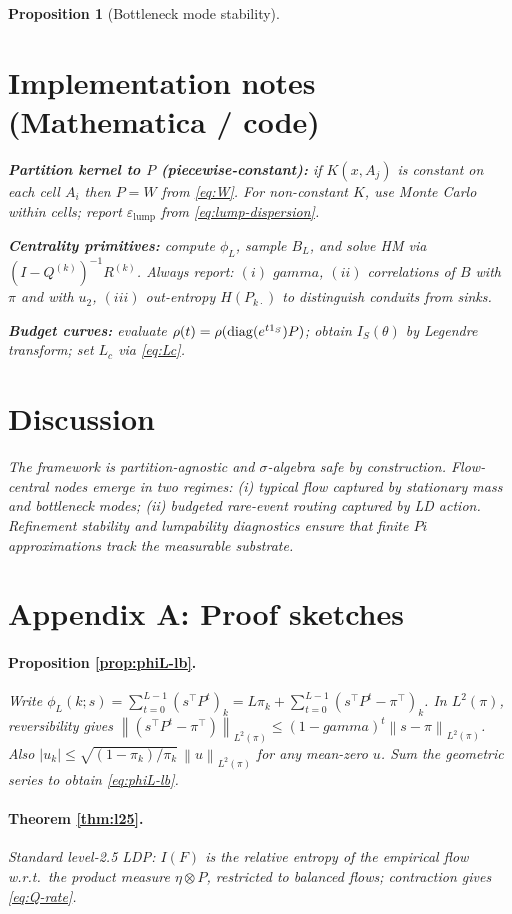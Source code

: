 \documentclass[11pt]{article}
\def\Pi{Pi}%
\def\sgap{gamma}%
\newcommand{\1}{\mathbbm{1}}
\newcommand{\diag}{\mathrm{diag}}
\newcommand{\norm}[1]{\left\lVert #1 \right\rVert}
\newcommand{\abs}[1]{\left\lvert #1 \right\rvert}
\newcommand{\sgap}{\gamma}
\theoremstyle{plain}
\newtheorem{proposition}[theorem]{Proposition}
\theoremstyle{definition}
\begin{document}
\begin{proposition}[Bottleneck mode stability]
\section{Implementation notes (Mathematica / code)}
\label{sec:impl}
\textbf{Partition kernel to $P$ (piecewise-constant):} if $K(x,A_j)$ is constant on each cell $A_i$ then $P=W$ from \eqref{eq:W}. For non-constant $K$, use Monte Carlo within cells; report $\varepsilon_{\mathrm{lump}}$ from \eqref{eq:lump-dispersion}.

\textbf{Centrality primitives:} compute $\phi_L$, sample $B_L$, and solve HM via $(I-Q^{(k)})^{-1}R^{(k)}$. Always report: $(i)$ $\sgap$, $(ii)$ correlations of $B$ with $\pi$ and with $u_2$, $(iii)$ out-entropy $H(P_{k\cdot})$ to distinguish conduits from sinks.

\textbf{Budget curves:} evaluate $\rho(t)=\rho(\diag(e^{t\1_S})P)$; obtain $I_S(\theta)$ by Legendre transform; set $L_c$ via \eqref{eq:Lc}.

\section{Discussion}
The framework is partition-agnostic and $\sigma$-algebra safe by construction. Flow-central nodes emerge in two regimes: (i) typical flow captured by stationary mass and bottleneck modes; (ii) budgeted rare-event routing captured by LD action. Refinement stability and lumpability diagnostics ensure that finite $\Pi$ approximations track the measurable substrate.

\section*{Appendix A: Proof sketches}
\paragraph{Proposition \ref{prop:phiL-lb}.}
Write $\phi_L(k;s)=\sum_{t=0}^{L-1}(s^\top P^t)_k=L\pi_k+\sum_{t=0}^{L-1}(s^\top P^t-\pi^\top)_k$. In $L^2(\pi)$, reversibility gives $\norm{(s^\top P^t-\pi^\top)}_{L^2(\pi)}\le (1-\sgap)^t\norm{s-\pi}_{L^2(\pi)}$. Also $\abs{u_k}\le \sqrt{(1-\pi_k)/\pi_k}\,\norm{u}_{L^2(\pi)}$ for any mean-zero $u$. Sum the geometric series to obtain \eqref{eq:phiL-lb}.

\paragraph{Theorem \ref{thm:l25}.}
Standard level-2.5 LDP: $I(F)$ is the relative entropy of the empirical flow w.r.t.\ the product measure $\eta\otimes P$, restricted to balanced flows; contraction gives \eqref{eq:Q-rate}.


\end{proposition}
\end{document}
